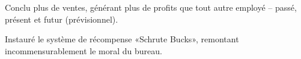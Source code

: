 \begin{achievements}
	\item Conclu plus de ventes, générant plus de profits que tout autre employé – passé, présent et futur (prévisionnel).
	\item Instauré le système de récompense «Schrute Bucks», remontant incommensurablement le moral du bureau.
\end{achievements}
